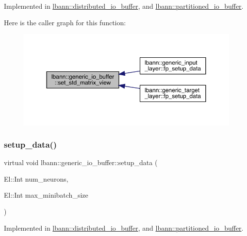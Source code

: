 Implemented in \hyperlink{classlbann_1_1distributed__io__buffer_a996d9d20ad162b3edb06fb8aa04ecd3d}{lbann\+::distributed\+\_\+io\+\_\+buffer}, and \hyperlink{classlbann_1_1partitioned__io__buffer_aa0a1d61dcecdd5c4091e0a97eb2d075a}{lbann\+::partitioned\+\_\+io\+\_\+buffer}.

Here is the caller graph for this function\+:\nopagebreak
\begin{figure}[H]
\begin{center}
\leavevmode
\includegraphics[width=350pt]{classlbann_1_1generic__io__buffer_a458d9bf722effce4177a0ac0aee9124f_icgraph}
\end{center}
\end{figure}
\mbox{\label{classlbann_1_1generic__io__buffer_a00f3920147f7f19eceb5336bd6ddb421}} 
\subsubsection{\texorpdfstring{setup\+\_\+data()}{setup\_data()}}
{\footnotesize\ttfamily virtual void lbann\+::generic\+\_\+io\+\_\+buffer\+::setup\+\_\+data (\begin{DoxyParamCaption}\item[{El\+::\+Int}]{num\+\_\+neurons,  }\item[{El\+::\+Int}]{max\+\_\+minibatch\+\_\+size }\end{DoxyParamCaption})\hspace{0.3cm}{\ttfamily [pure virtual]}}



Implemented in \hyperlink{classlbann_1_1distributed__io__buffer_aec36cf1d148646f0e27d5939664f02d8}{lbann\+::distributed\+\_\+io\+\_\+buffer}, and \hyperlink{classlbann_1_1partitioned__io__buffer_a06a204fbf82f092b0225ab10c1bec98e}{lbann\+::partitioned\+\_\+io\+\_\+buffer}.

